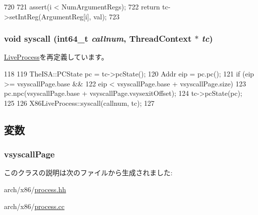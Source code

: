 \begin{DoxyCode}
720 {
721     assert(i < NumArgumentRegs);
722     return tc->setIntReg(ArgumentReg[i], val);
723 }
\end{DoxyCode}
\hypertarget{classX86ISA_1_1I386LiveProcess_a1ed38802271de4269c3adfa46c73e7e7}{
\subsubsection[{syscall}]{\setlength{\rightskip}{0pt plus 5cm}void syscall (int64\_\-t {\em callnum}, \/  {\bf ThreadContext} $\ast$ {\em tc})}}
\label{classX86ISA_1_1I386LiveProcess_a1ed38802271de4269c3adfa46c73e7e7}


\hyperlink{classLiveProcess_a1ed38802271de4269c3adfa46c73e7e7}{LiveProcess}を再定義しています。


\begin{DoxyCode}
118 {
119     TheISA::PCState pc = tc->pcState();
120     Addr eip = pc.pc();
121     if (eip >= vsyscallPage.base &&
122             eip < vsyscallPage.base + vsyscallPage.size) {
123         pc.npc(vsyscallPage.base + vsyscallPage.vsysexitOffset);
124         tc->pcState(pc);
125     }
126     X86LiveProcess::syscall(callnum, tc);
127 }
\end{DoxyCode}


\subsection{変数}
\hypertarget{classX86ISA_1_1I386LiveProcess_a9f7ed190dd32bddc3f1074ce39168abd}{
\subsubsection[{vsyscallPage}]{ {\bf vsyscallPage}}}
\label{classX86ISA_1_1I386LiveProcess_a9f7ed190dd32bddc3f1074ce39168abd}


このクラスの説明は次のファイルから生成されました:\begin{DoxyCompactItemize}
\item 
arch/x86/\hyperlink{arch_2x86_2process_8hh}{process.hh}\item 
arch/x86/\hyperlink{arch_2x86_2process_8cc}{process.cc}\end{DoxyCompactItemize}
